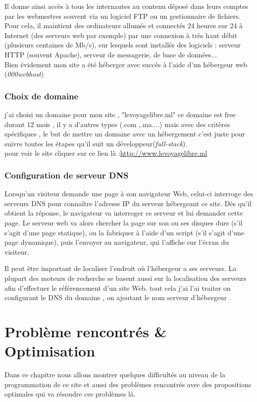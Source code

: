 \documentclass[a4paper,12pt]{report}
\begin{document}
Il donne ainsi accès à tous les internautes au contenu déposé dans leurs comptes par les webmestres souvent via un logiciel FTP ou un gestionnaire de fichiers. Pour cela, il maintient des ordinateurs allumés et connectés 24 heures sur 24 à Internet (des serveurs web par exemple) par une connexion à très haut débit (plusieurs centaines de Mb/s), sur lesquels sont installés des logiciels : serveur HTTP (souvent Apache), serveur de messagerie, de base de données...\\
Bien évidement mon site a été héberger avec succès à l'aide d'un hébergeur web (\textit{000webhost})
\subsection{Choix de domaine}
j'ai choisi un domaine pour mon site , "levoyagelibre.ml" ce domaine est free durant 12 mois , il y a d'autres types (.com ,.ma....) mais avec des critères spécifiques , le but de mettre un domaine avec un hébergement c'est juste pour suivre toutes les étapes qu'il suit un développeur(\textit{full-stack}).\\
pour voir le site cliquer sur ce lien là :\url{http://www.levoyagelibre.ml}
\subsection{Configuration de serveur DNS}
Lorsqu'un visiteur demande une page à son navigateur Web, celui-ci interroge des serveurs DNS pour connaître l'adresse IP du serveur hébergeant ce site. Dès qu'il obtient la réponse, le navigateur va interroger ce serveur et lui demander cette page. Le serveur web va alors chercher la page sur son ou ses disques durs (s'il s'agit d'une page statique), ou la fabriquer à l'aide d'un script (s'il s'agit d'une page dynamique), puis l'envoyer au navigateur, qui l'affiche sur l'écran du visiteur.

Il peut être important de localiser l'endroit où l'hébergeur a ses serveurs. La plupart des moteurs de recherche se basent aussi sur la localisation des serveurs afin d'effectuer le référencement d'un site Web.
tout cela j'ai l'ai traiter on configurant le DNS du domaine , on ajoutant le nom serveur d'hébergeur .
\chapter{Problème rencontrés \& Optimisation}
Dans ce chapitre nous allons montrer quelques difficultés au niveau de la programmation de ce site et aussi des problèmes rencontrés avec des propositions optimales qui va résoudre ces problèmes là.
\end{document}
